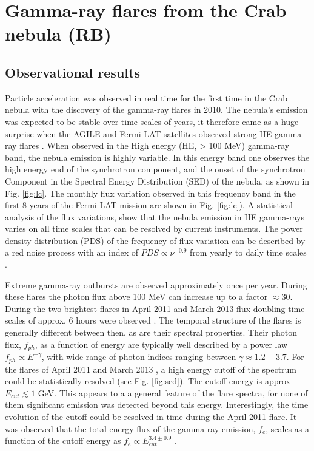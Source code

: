 \section{Gamma-ray flares from the Crab nebula (RB)}
\label{sec:flares}
\subsection{Observational results}

Particle acceleration was observed in real time for the first time in the Crab nebula with the discovery of the gamma-ray flares in 2010.  The nebula's emission was expected to  be stable over time scales of years, it therefore came as a huge surprise when the AGILE and Fermi-LAT satellites observed strong HE gamma-ray flares \citep{Tavani2011,Abdo2011}. When observed in the High energy (HE, > 100 MeV) gamma-ray band, the nebula emission is highly variable. In this energy band one observes the high energy end of the synchrotron component, and the onset of the synchrotron Component in the Spectral Energy Distribution (SED) of the nebula, as shown in Fig. \ref{fig:lc}. The monthly flux variation observed in this frequency band in the first 8 years of the Fermi-LAT mission are shown in Fig. \ref{fig:lc}). A statistical analysis of the flux variations, show that the nebula emission in HE gamma-rays varies on all time scales that can be resolved by current instruments. The power density distribution (PDS) of the frequency of flux variation can be described by a red noise process with an index of $PDS \propto \nu^{-0.9}$  from yearly to daily time scales \citep{buehler2012}.

Extreme gamma-ray outbursts are observed approximately once per year. During these flares the photon flux above 100 MeV can increase up to a factor $\approx 30$. During the two brightest flares in April 2011 and March 2013 flux doubling time scales of approx. 6 hours were observed \citep{buehler2012,Mayer2013}. The temporal structure of the flares is generally different between then, as are their spectral properties. Their photon flux, $f_{ph}$,  as a function of energy are typically well described by a power law $f_{ph} \propto E^{-\gamma}$, with  wide range of photon indices ranging between  $\gamma \approx 1.2 - 3.7$. For the flares of April 2011 and March 2013 , a high energy cutoff of the spectrum could be statistically resolved (see Fig. \ref{fig:sed}). The cutoff energy is approx $E_{cut} \lesssim 1$ GeV. This appears to a a general feature of the flare spectra, for none of them significant emission was detected beyond this energy. Interestingly, the time evolution of the cutoff could be resolved in time during the April 2011 flare. It was observed that the total energy flux of the gamma ray emission, $f_e$,  scales as a function of the cutoff energy as $f_e \propto E_{cut}^{3.4 \pm 0.9}$  \citep{buehler2012}.

